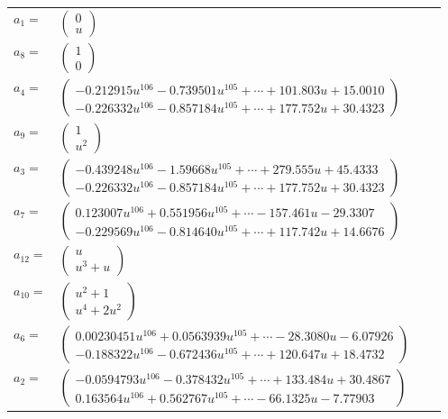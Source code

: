\documentclass[1p]{elsarticle_modified}
\theoremstyle{definition}
\begin{document}
\begin{tabular}{m{7pt} m{180pt} m{7pt} m{180pt} }
\flushright $a_{1}=$&$\begin{pmatrix}0\\u\end{pmatrix}$ \\
\flushright $a_{8}=$&$\begin{pmatrix}1\\0\end{pmatrix}$ \\
\flushright $a_{4}=$&$\begin{pmatrix}-0.212915 u^{106}-0.739501 u^{105}+\cdots+101.803 u+15.0010\\-0.226332 u^{106}-0.857184 u^{105}+\cdots+177.752 u+30.4323\end{pmatrix}$ \\
\flushright $a_{9}=$&$\begin{pmatrix}1\\u^2\end{pmatrix}$ \\
\flushright $a_{3}=$&$\begin{pmatrix}-0.439248 u^{106}-1.59668 u^{105}+\cdots+279.555 u+45.4333\\-0.226332 u^{106}-0.857184 u^{105}+\cdots+177.752 u+30.4323\end{pmatrix}$ \\
\flushright $a_{7}=$&$\begin{pmatrix}0.123007 u^{106}+0.551956 u^{105}+\cdots-157.461 u-29.3307\\-0.229569 u^{106}-0.814640 u^{105}+\cdots+117.742 u+14.6676\end{pmatrix}$ \\
\flushright $a_{12}=$&$\begin{pmatrix}u\\u^3+u\end{pmatrix}$ \\
\flushright $a_{10}=$&$\begin{pmatrix}u^2+1\\u^4+2 u^2\end{pmatrix}$ \\
\flushright $a_{6}=$&$\begin{pmatrix}0.00230451 u^{106}+0.0563939 u^{105}+\cdots-28.3080 u-6.07926\\-0.188322 u^{106}-0.672436 u^{105}+\cdots+120.647 u+18.4732\end{pmatrix}$ \\
\flushright $a_{2}=$&$\begin{pmatrix}-0.0594793 u^{106}-0.378432 u^{105}+\cdots+133.484 u+30.4867\\0.163564 u^{106}+0.562767 u^{105}+\cdots-66.1325 u-7.77903\end{pmatrix}$ \\

\end{tabular}
\end{document}
